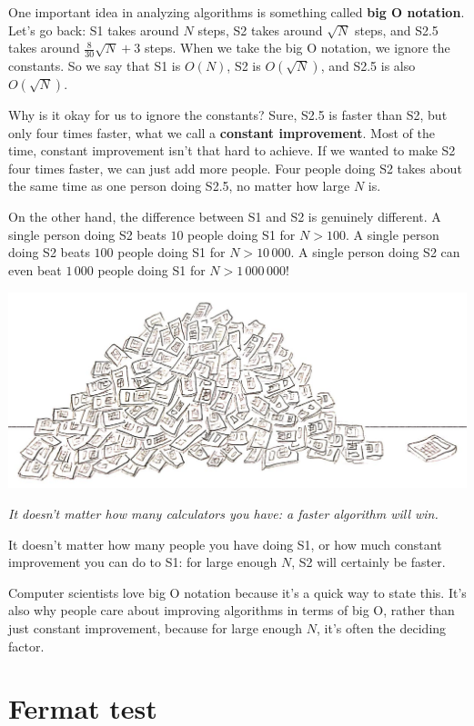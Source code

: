 \documentclass[11pt,paper=letter]{scrartcl}
\begin{document}
One important idea in analyzing algorithms is something called \textbf{big O notation}. Let's go back: S1 takes around $N$ steps, S2 takes around $\sqrt{N}$ steps, and S2.5 takes around $\frac8{30}\sqrt{N} + 3$ steps. When we take the big O notation, we ignore the constants. So we say that S1 is $O(N)$, S2 is $O(\sqrt{N})$, and S2.5 is also $O(\sqrt{N})$.

Why is it okay for us to ignore the constants? Sure, S2.5 is faster than S2, but only four times faster, what we call a \textbf{constant improvement}. Most of the time, constant improvement isn't that hard to achieve. If we wanted to make S2 four times faster, we can just add more people. Four people doing S2 takes about the same time as one person doing S2.5, no matter how large $N$ is.

On the other hand, the difference between S1 and S2 is genuinely different. A single person doing S2 beats $10$ people doing S1 for $N > 100$. A single person doing S2 beats $100$ people doing S1 for $N > 10\,000$. A single person doing S2 can even beat $1\,000$ people doing S1 for $N > 1\,000\,000$!

\begin{center}
  \includegraphics[height=2.25in]{2.jpg}

  \emph{\footnotesize It doesn't matter how many calculators you have: a faster algorithm will win.}
\end{center}

It doesn't matter how many people you have doing S1, or how much constant improvement you can do to S1: for large enough $N$, S2 will certainly be faster.

Computer scientists love big O notation because it's a quick way to state this. It's also why people care about improving algorithms in terms of big O, rather than just constant improvement, because for large enough $N$, it's often the deciding factor.

\section{Fermat test}
\end{document}
